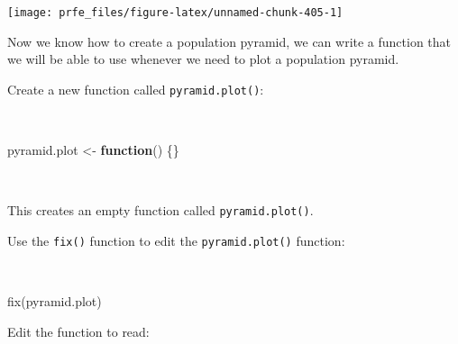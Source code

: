 \documentclass[
  12pt,
  a4paper]{book}
\newenvironment{Shaded}{\begin{snugshade}}{\end{snugshade}}
\newcommand{\ControlFlowTok}[1]{\textcolor[rgb]{0.13,0.29,0.53}{\textbf{#1}}}
\newcommand{\FunctionTok}[1]{\textcolor[rgb]{0.00,0.00,0.00}{#1}}
\newcommand{\NormalTok}[1]{#1}
\newcommand{\OtherTok}[1]{\textcolor[rgb]{0.56,0.35,0.01}{#1}}
\begin{document}
\newpage

\begin{center}\texttt{[image: prfe\_files/figure-latex/unnamed-chunk-405-1]} \end{center}

Now we know how to create a population pyramid, we can write a function that we will be able to use whenever we need to plot a population pyramid.

Create a new function called \texttt{pyramid.plot()}:

~

\begin{Shaded}
\begin{Highlighting}[]
\NormalTok{pyramid.plot }\OtherTok{\textless{}{-}} \ControlFlowTok{function}\NormalTok{() \{\}}
\end{Highlighting}
\end{Shaded}

~

This creates an empty function called \texttt{pyramid.plot()}.

Use the \texttt{fix()} function to edit the \texttt{pyramid.plot()} function:

~

\begin{Shaded}
\begin{Highlighting}[]
\FunctionTok{fix}\NormalTok{(pyramid.plot)}
\end{Highlighting}
\end{Shaded}

\newpage

Edit the function to read:

~
\end{document}

